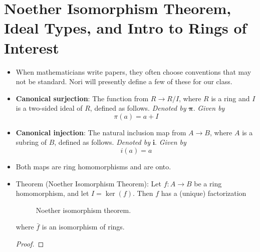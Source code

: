 \documentclass[../notes.tex]{subfiles}
\begin{document}
\section{Noether Isomorphism Theorem, Ideal Types, and Intro to Rings of Interest}
\begin{itemize}
    \item {}When mathematicians write papers, they often choose conventions that may not be standard. Nori will presently define a few of these for our class.
    \item \textbf{Canonical surjection}: The function from $R\to R/I$, where $R$ is a ring and $I$ is a two-sided ideal of $R$, defined as follows. \emph{Denoted by} $\bm{\pi}$. \emph{Given by}
    \begin{equation*}
        \pi(a) = a+I
    \end{equation*}
    \item \textbf{Canonical injection}: The natural inclusion map from $A\to B$, where $A$ is a subring of $B$, defined as follows. \emph{Denoted by} $\bm{i}$. \emph{Given by}
    \begin{equation*}
        i(a) = a
    \end{equation*}
    \item Both maps are ring homomorphisms and are onto.
    \item Theorem (Noether Isomorphism Theorem): Let $f:A\to B$ be a ring homomorphism, and let $I=\ker(f)$. Then $f$ has a (unique) factorization
    \begin{figure}[H]
        \centering
        \caption{Noether isomorphism theorem.}
        \label{fig:NoetherIsoTrm}
    \end{figure}
    where $\bar{f}$ is an isomorphism of rings.
    \begin{proof}



\end{proof}
\end{itemize}
\end{document}
